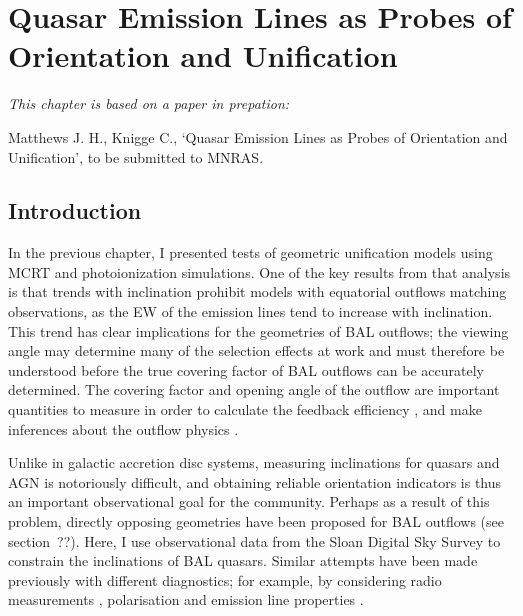 \chapter{Quasar Emission Lines as Probes of Orientation and Unification}



{\em This chapter is based on a paper in prepation:

Matthews J. H., Knigge C., 
`Quasar Emission Lines as Probes of Orientation and Unification',
to be submitted to MNRAS.}


%
%
\maketitle

\section{Introduction}

In the previous chapter, I presented tests of geometric unification
models using MCRT and photoionization simulations. 
One of the key results from that analysis is that trends with
inclination prohibit models with equatorial outflows matching
observations, as the EW of the emission lines tend
to increase with inclination. This trend has clear implications for
the geometries of BAL outflows; the viewing angle may determine many
of the selection effects at work and must therefore be understood
before the true covering factor of BAL outflows can be accurately 
determined. The covering factor and opening angle of the outflow
are important quantities to measure in order to calculate the
feedback efficiency \citep[e.g.][]{borguet2012}, 
and make inferences about the outflow physics \citep[e.g.][]{proga2005}. 

Unlike in galactic accretion disc systems, measuring inclinations
for quasars and AGN is notoriously difficult, and obtaining 
reliable orientation indicators is thus an important observational
goal for the community. Perhaps as a result of this problem, 
directly opposing geometries have been proposed for 
BAL outflows (see section~??). Here, I use observational 
data from the Sloan Digital Sky Survey to constrain the inclinations
of BAL quasars. Similar attempts have been made previously with
different diagnostics; for example, by considering 
radio measurements \citep{zhou2006,dipompeo2012a}, 
polarisation \citep{brotherton2006}
and emission line properties \citep{dipompeo2012b}.  

